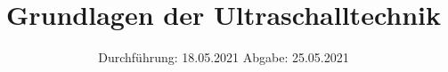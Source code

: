 

\subject{US1}
\title{Grundlagen der Ultraschalltechnik}
\date{%
  Durchführung: 18.05.2021
  \hspace{3em}
  Abgabe: 25.05.2021
}



\maketitle
\thispagestyle{empty}
\tableofcontents
\newpage







\printbibliography{}


